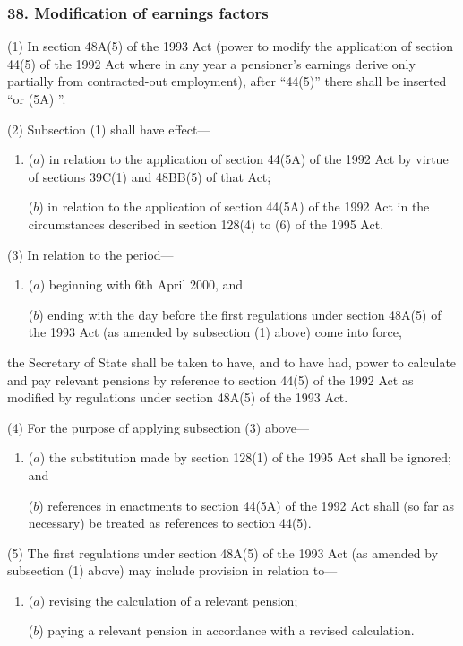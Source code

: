 \documentclass[12pt,a4paper]{article}
\begin{document}

\subsubsection{38. Modification of earnings factors}

(1) In section 48A(5)  of the 1993 Act (power to modify the application of section 44(5)  of the 1992 Act where in any year a pensioner’s earnings derive only partially from contracted-out employment), after “44(5)” there shall be inserted “or (5A) ”.

(2) Subsection (1)  shall have effect—
\begin{enumerate}\item[]
($a$) in relation to the application of section 44(5A)  of the 1992 Act by virtue of sections 39C(1)  and 48BB(5)  of that Act;

($b$) in relation to the application of section 44(5A)  of the 1992 Act in the circumstances described in section 128(4)  to (6)  of the 1995 Act.
\end{enumerate}

(3) In relation to the period—
\begin{enumerate}\item[]
($a$) beginning with 6th April 2000, and

($b$) ending with the day before the first regulations under section 48A(5)  of the 1993 Act (as amended by subsection (1)  above) come into force,
\end{enumerate}
the Secretary of State shall be taken to have, and to have had, power to calculate and pay relevant pensions by reference to section 44(5)  of the 1992 Act as modified by regulations under section 48A(5)  of the 1993 Act.

(4) For the purpose of applying subsection (3)  above—
\begin{enumerate}\item[]
($a$) the substitution made by section 128(1)  of the 1995 Act shall be ignored; and

($b$) references in enactments to section 44(5A)  of the 1992 Act shall (so far as necessary) be treated as references to section 44(5).
\end{enumerate}

(5) The first regulations under section 48A(5)  of the 1993 Act (as amended by subsection (1)  above) may include provision in relation to—
\begin{enumerate}\item[]
($a$) revising the calculation of a relevant pension;

($b$) paying a relevant pension in accordance with a revised calculation.
\end{enumerate}
\end{document}
